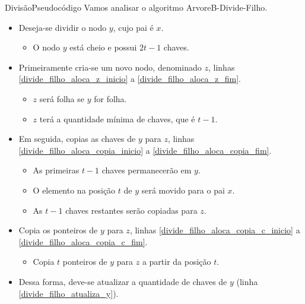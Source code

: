 \documentclass[aspectratio=169]{beamer}
\begin{document}
{%

\begin{frame}{Divisão}{Pseudocódigo}
Vamos analisar o algoritmo ArvoreB-Divide-Filho.
\begin{itemize}
 \item Deseja-se dividir o nodo $y$, cujo pai é $x$.
 \begin{itemize}
  \item O nodo $y$ está cheio e possui $2t-1$ chaves.
 \end{itemize}
 \item Primeiramente cria-se um novo nodo, denominado $z$, linhas \ref{divide_filho_aloca_z_inicio} a \ref{divide_filho_aloca_z_fim}.
 \begin{itemize}
 \item $z$ será folha se $y$ for folha.
 \item $z$ terá a quantidade mínima de chaves, que é $t-1$.
 \end{itemize}
 \item Em seguida, copias as chaves de $y$  para $z$, linhas \ref{divide_filho_aloca_copia_inicio} a \ref{divide_filho_aloca_copia_fim}.
 \begin{itemize}
 \item As primeiras $t-1$ chaves permanecerão em $y$.
 \item O elemento na posição $t$ de $y$ será movido para o pai $x$.
 \item As $t-1$ chaves restantes serão copiadas para $z$.
\end{itemize}
 \item Copia os ponteiros de $y$  para $z$, linhas \ref{divide_filho_aloca_copia_c_inicio} a \ref{divide_filho_aloca_copia_c_fim}.
 \begin{itemize}
 \item Copia $t$ ponteiros de $y$ para $z$ a partir da posição $t$.
\end{itemize}
\item Dessa forma, deve-se atualizar a quantidade de chaves de $y$ (linha \ref{divide_filho_atualiza_y}).
\end{itemize}
\end{frame}



}
\end{document}
